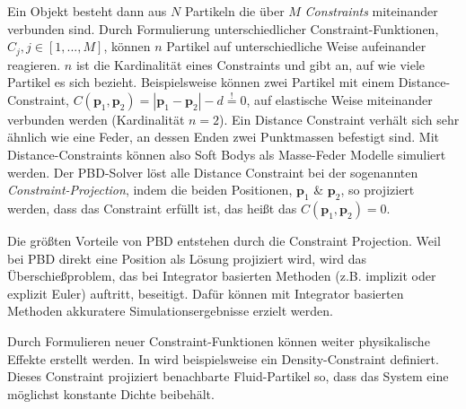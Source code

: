 Ein Objekt besteht dann aus $N$ Partikeln die über $M$ \textit{Constraints} miteinander verbunden sind. Durch Formulierung unterschiedlicher Constraint-Funktionen, $C_j, j \in [1,...,M] $, können $n$ Partikel auf unterschiedliche Weise aufeinander reagieren. $n$ ist die Kardinalität eines Constraints und gibt an, auf wie viele Partikel es sich bezieht.
Beispielsweise können zwei Partikel mit einem Distance-Constraint, $C(\textbf{p}_1,\textbf{p}_2) = |\textbf{p}_1-\textbf{p}_2|-d \stackrel{!}{=} 0$, auf elastische Weise miteinander verbunden werden (Kardinalität $n=2$). Ein Distance Constraint verhält sich sehr ähnlich wie eine Feder, an dessen Enden zwei Punktmassen befestigt sind. Mit Distance-Constraints können also Soft Bodys als Masse-Feder Modelle simuliert werden. Der PBD-Solver löst alle Distance Constraint bei der sogenannten \textit{Constraint-Projection}, indem die beiden Positionen, $\textbf{p}_1$ \& $\textbf{p}_2$, so projiziert werden, dass das Constraint erfüllt ist, das heißt das $C(\textbf{p}_1,\textbf{p}_2) = 0$. 

Die größten Vorteile von PBD entstehen durch die Constraint Projection. 
Weil bei PBD direkt eine Position als Lösung projiziert wird,
wird das Überschießproblem, das bei Integrator basierten Methoden (z.B. implizit oder explizit Euler) auftritt, beseitigt. 
Dafür können mit Integrator basierten Methoden akkuratere Simulationsergebnisse erzielt werden.

Durch Formulieren neuer Constraint-Funktionen können weiter physikalische Effekte erstellt werden. In \cite{UPP} wird beispielsweise ein Density-Constraint definiert. Dieses Constraint projiziert benachbarte Fluid-Partikel so, dass das System eine möglichst konstante Dichte beibehält.


